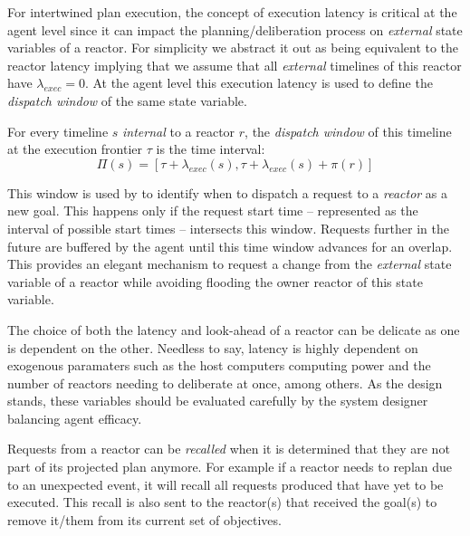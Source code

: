 For intertwined plan execution, the concept of execution latency is
critical at the agent level since it can impact the
planning/deliberation process on {\em external} state variables of a
reactor. For simplicity we abstract it out as being equivalent to the
reactor latency implying that we assume that all {\em external}
timelines of this reactor have $\lambda_{exec} = 0$. At the \rx agent
level this execution latency is used to define the {\em dispatch
  window} of the same state variable.

\begin{definition}
  \label{def:dispatch}
  For every timeline $s$ {\em internal} to a reactor $r$, the {\em
    dispatch window} of this timeline at the execution frontier $\tau$
  is the time interval:
  \begin{equation*}
    \Pi(s) = [\tau + \lambda_{exec}(s), \tau+\lambda_{exec}(s)+\pi(r)]
  \end{equation*}
\end{definition}

This window is used by \rx to identify when to dispatch a request to a
{\em reactor} as a new goal. This happens only if the request start
time -- represented as the interval of possible start times --
intersects this window. Requests further in the future are buffered by
the agent until this time window advances for an overlap. This
provides an elegant mechanism to request a change from the {\em
  external} state variable of a reactor while avoiding flooding the
owner reactor of this state variable. 

The choice of both the latency and look-ahead of a reactor can be
delicate as one is dependent on the other. Needless to say, latency is
highly dependent on exogenous paramaters such as the host computers
computing power and the number of reactors needing to deliberate at
once, among others. As the design stands, these variables should be
evaluated carefully by the system designer balancing agent efficacy.


Requests from a reactor can be {\em recalled} when it is determined
that they are not part of its projected plan anymore. For example if a
reactor needs to replan due to an unexpected event, it will recall all
requests produced that have yet to be executed.  This recall is also
sent to the reactor(s) that received the goal(s) to remove it/them
from its current set of objectives.

